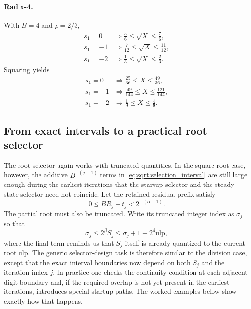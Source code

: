 \documentclass[11pt]{article}
\newcommand{\ulp}{\mathrm{ulp}}
\numberwithin{equation}{section}
\begin{document}
\paragraph{Radix-4.}
With $B=4$ and $\rho=2/3$,
\begin{align*}
  s_1=0 &\Longrightarrow \frac{5}{6} \le \sqrt{X} \le \frac{7}{6}, \\
  s_1=-1 &\Longrightarrow \frac{7}{12} \le \sqrt{X} \le \frac{11}{12}, \\
  s_1=-2 &\Longrightarrow \frac{1}{3} \le \sqrt{X} \le \frac{2}{3}.
\end{align*}
Squaring yields
\begin{align*}
  s_1=0 &\Longrightarrow \frac{25}{36} \le X \le \frac{49}{36}, \\
  s_1=-1 &\Longrightarrow \frac{49}{144} \le X \le \frac{121}{144}, \\
  s_1=-2 &\Longrightarrow \frac{1}{9} \le X \le \frac{4}{9}.
\end{align*}

\subsection{From exact intervals to a practical root selector}
\label{ssec:sqrt:practical_selector}

The root selector again works with truncated quantities.
In the square-root case, however, the additive $B^{-(j+1)}$ terms in
\cref{eq:sqrt:selection_interval} are still large enough during the earliest iterations that the
startup selector and the steady-state selector need not coincide.
Let the retained residual prefix satisfy
\begin{equation}
  \label{eq:sqrt:trunc_error_generic}
  0 \le BR_j - t_j < 2^{-(\alpha-1)}.
\end{equation}
The partial root must also be truncated.
Write its truncated integer index as $\sigma_j$ so that
\begin{equation}
  \label{eq:sqrt:partial_root_trunc_generic}
  \sigma_j \le 2^{\beta}S_j \le \sigma_j + 1 - 2^{\beta}\ulp,
\end{equation}
where the final term reminds us that $S_j$ itself is already quantized to the current root ulp.
The generic selector-design task is therefore similar to the division case, except that the exact
interval boundaries now depend on both $S_j$ and the iteration index $j$.
In practice one checks the continuity condition at each adjacent digit boundary and, if the
required overlap is not yet present in the earliest iterations, introduces special startup paths.
The worked examples below show exactly how that happens.
\end{document}
